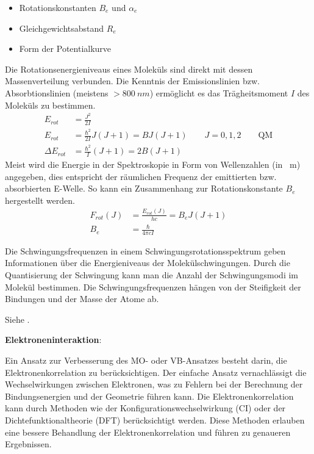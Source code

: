 \label{q:22}
\begin{itemize}
    \item Rotationskonstanten $B_e$ und $\alpha_e$ 
    \item Gleichgewichtsabstand $R_e$
    \item Form der Potentialkurve
\end{itemize}
Die Rotationsenergieniveaus eines Moleküls sind direkt mit dessen Massenverteilung verbunden.
Die Kenntnis der Emissionslinien bzw. Absorbtionslinien (meistens $>\SI{800}{nm}$) ermöglicht es das Trägheitsmoment $I$ des Moleküls zu bestimmen.
\begin{align}
    E_{rot} &= \frac{J^2}{2I} \\
    E_{rot} &= \frac{\hbar^2}{2I}J(J+1) = BJ(J+1) \qquad J = 0,1,2 \qquad \text{QM} \\
    \Delta E_{rot} &= \frac{\hbar^2}{I}(J+1) = 2B(J+1)
\end{align}
Meist wird die Energie in der Spektroskopie in Form von Wellenzahlen (in \si{\per\meter}) angegeben, dies entspricht der räumlichen Frequenz der emittierten bzw. absorbierten E-Welle.
So kann ein Zusammenhang zur Rotationskonstante $B_e$ hergestellt werden.
\begin{align}
    F_{rot}(J) &= \frac{E_{rot}(J)}{h c} = B_e J(J+1) \\
    B_e &= \frac{\hbar}{4 \pi c I}
\end{align}

Die Schwingungsfrequenzen in einem Schwingungsrotationsspektrum geben Informationen über die Energieniveaus der Molekülschwingungen. 
Durch die Quantisierung der Schwingung kann man die Anzahl der Schwingungsmodi im Molekül bestimmen.
Die Schwingungsfrequenzen hängen von der Steifigkeit der Bindungen und der Masse der Atome ab.


\label{q:23}

Siehe .

\label{q:24}

\textbf{Elektroneninteraktion}:

Ein Ansatz zur Verbesserung des MO- oder VB-Ansatzes besteht darin, die Elektronenkorrelation zu berücksichtigen. 
Der einfache Ansatz vernachlässigt die Wechselwirkungen zwischen Elektronen, was zu Fehlern bei der Berechnung der Bindungsenergien und der Geometrie führen kann. 
Die Elektronenkorrelation kann durch Methoden wie der Konfigurationswechselwirkung (CI) oder der Dichtefunktionaltheorie (DFT) berücksichtigt werden. 
Diese Methoden erlauben eine bessere Behandlung der Elektronenkorrelation und führen zu genaueren Ergebnissen.

